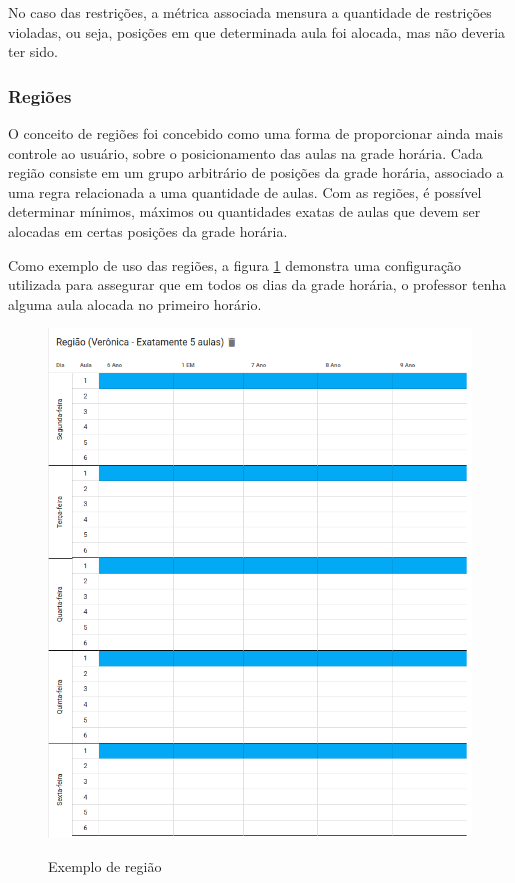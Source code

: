 No caso das restrições, a métrica associada mensura a quantidade de restrições violadas, ou seja, posições em que determinada aula foi alocada, mas não deveria ter sido.

\subsubsection{Regiões}

O conceito de regiões foi concebido como uma forma de proporcionar ainda mais controle ao usuário, sobre o posicionamento das aulas na grade horária. Cada região consiste em um grupo arbitrário de posições da grade horária, associado a uma regra relacionada a uma quantidade de aulas. Com as regiões, é possível determinar mínimos, máximos ou quantidades exatas de aulas que devem ser alocadas em certas posições da grade horária.

Como exemplo de uso das regiões, a figura \ref{fig:regioes} demonstra uma configuração utilizada para assegurar que em todos os dias da grade horária, o professor tenha alguma aula alocada no primeiro horário.

\begin{figure}[!htb]
	\centering
	\caption{Exemplo de região}
	\includegraphics[width=1\textwidth]{./dados/figuras/regioes}
	\label{fig:regioes}
\end{figure}
\pagebreak

